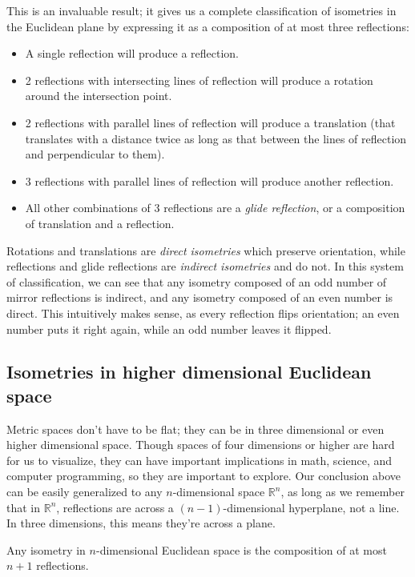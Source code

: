 \documentclass{mystyle}
\begin{document}
This is an invaluable result; it gives us a complete classification of isometries in the Euclidean plane by expressing it as a composition of at most three reflections:
\begin{itemize}
    \item A single reflection will produce a reflection.
    \item 2 reflections with intersecting lines of reflection will produce a rotation around the intersection point.
    \item 2 reflections with parallel lines of reflection will produce a translation (that translates with a distance twice as long as that between the lines of reflection and perpendicular to them).
    \item 3 reflections with parallel lines of reflection will produce another reflection.
    \item All other combinations of 3 reflections are a \textit{glide reflection}, or a composition of translation and a reflection. 
\end{itemize}

Rotations and translations are \textit{direct isometries} which preserve orientation, while reflections and glide reflections are \textit{indirect isometries} and do not. In this system of classification, we can see that any isometry composed of an odd number of mirror reflections is indirect, and any isometry composed of an even number is direct. This intuitively makes sense, as every reflection flips orientation; an even number puts it right again, while an odd number leaves it flipped.

\subsection{Isometries in higher dimensional Euclidean space}
Metric spaces don't have to be flat; they can be in three dimensional or even higher dimensional space. Though spaces of four dimensions or higher are hard for us to visualize, they can have important implications in math, science, and computer programming, so they are important to explore. Our conclusion above can be easily generalized to any $n$-dimensional space $\mathbb{R}^n$, as long as we remember that in $\mathbb{R}^n$, reflections are across a $(n-1)$-dimensional hyperplane, not a line. In three dimensions, this means they're across a plane. 

\begin{theorem}\label{thm_euc_ndim_isometry}
    Any isometry in $n$-dimensional Euclidean space is the composition of at most $n+1$ reflections.
\end{theorem}
\end{document}

